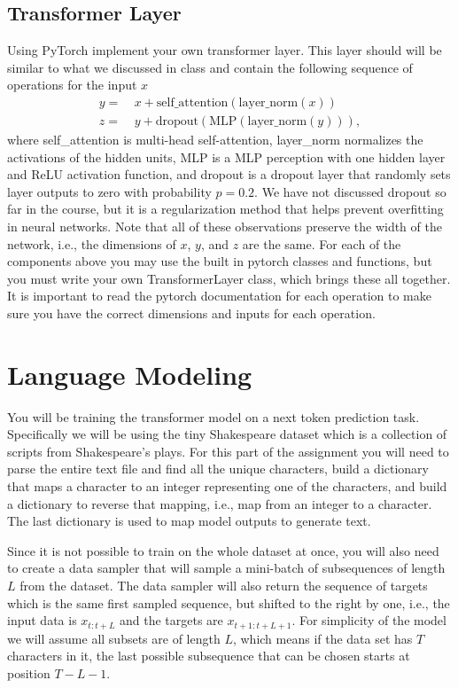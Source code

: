 \documentclass{article}
\begin{document}
\subsection{Transformer Layer}

Using PyTorch implement your own transformer layer. This layer should will be similar to what we discussed in class and contain the following sequence of operations for the input $x$
\begin{align}
    y = &\  x + \textrm{self\_attention}(\textrm{layer\_norm}(x)) \\
    z = &\ y + \textrm{dropout}(\textrm{MLP}(\textrm{layer\_norm}(y))),
\end{align}
where \textrm{self\_attention} is multi-head self-attention, \textrm{layer\_norm} normalizes the activations of the hidden units, \textrm{MLP} is a MLP perception with one hidden layer and ReLU activation function, and \textrm{dropout} is a dropout layer that randomly sets layer outputs to zero with probability $p=0.2$. We have not discussed dropout so far in the course, but it is a regularization method that helps prevent overfitting in neural networks. Note that all of these observations preserve the width of the network, i.e., the dimensions of $x$, $y$, and $z$ are the same. 
%
For each of the components above you may use the built in pytorch classes and functions, but you must write your own TransformerLayer class, which brings these all together. 
%
It is important to read the pytorch documentation for each operation to make sure you have the correct dimensions and inputs for each operation. 

\section{Language Modeling}
You will be training the transformer model on a next token prediction task. Specifically we will be using the tiny Shakespeare dataset which is a collection of scripts from Shakespeare's plays. For this part of the assignment you will need to parse the entire text file and find all the unique characters, build a dictionary that maps a character to an integer representing one of the characters, and build a dictionary to reverse that mapping, i.e., map from an integer to a character. The last dictionary is used to map model outputs to generate text. 

Since it is not possible to train on the whole dataset at once, you will also need to create a data sampler that will sample a mini-batch of subsequences of length $L$ from the dataset. The data sampler will also return the sequence of targets which is the same first sampled sequence, but shifted to the right by one, i.e., the input data is $x_{t:t+L}$ and the targets are $x_{t+1:t+L+1}$. For simplicity of the model we will assume all subsets are of length $L$, which means if the data set has $T$ characters in it, the last possible subsequence that can be chosen starts at position $T-L-1$.  
\end{document}
